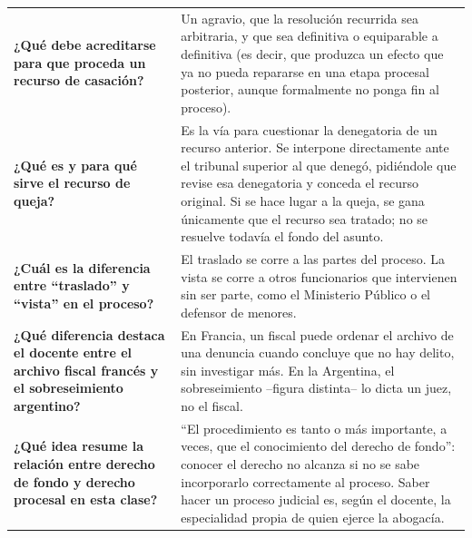 \documentclass[12pt,oneside]{book}
\begin{document}
\begin{longtable}{
    >{\raggedright\arraybackslash}p{}
    >{\raggedright\arraybackslash}p{}
}
\textbf{¿Qué debe acreditarse para que proceda un recurso de casación?} &
Un agravio, que la resolución recurrida sea arbitraria, y que sea definitiva o equiparable a definitiva (es decir, que produzca un efecto que ya no pueda repararse en una etapa procesal posterior, aunque formalmente no ponga fin al proceso). \\

\textbf{¿Qué es y para qué sirve el recurso de queja?} &
Es la vía para cuestionar la denegatoria de un recurso anterior. Se interpone directamente ante el tribunal superior al que denegó, pidiéndole que revise esa denegatoria y conceda el recurso original. Si se hace lugar a la queja, se gana únicamente que el recurso sea tratado; no se resuelve todavía el fondo del asunto. \\

\textbf{¿Cuál es la diferencia entre ``traslado'' y ``vista'' en el proceso?} &
El traslado se corre a las partes del proceso. La vista se corre a otros funcionarios que intervienen sin ser parte, como el Ministerio Público o el defensor de menores. \\

\textbf{¿Qué diferencia destaca el docente entre el archivo fiscal francés y el sobreseimiento argentino?} &
En Francia, un fiscal puede ordenar el archivo de una denuncia cuando concluye que no hay delito, sin investigar más. En la Argentina, el sobreseimiento --figura distinta-- lo dicta un juez, no el fiscal. \\

\textbf{¿Qué idea resume la relación entre derecho de fondo y derecho procesal en esta clase?} &
``El procedimiento es tanto o más importante, a veces, que el conocimiento del derecho de fondo'': conocer el derecho no alcanza si no se sabe incorporarlo correctamente al proceso. Saber hacer un proceso judicial es, según el docente, la especialidad propia de quien ejerce la abogacía. \\


\end{longtable}
\end{document}
